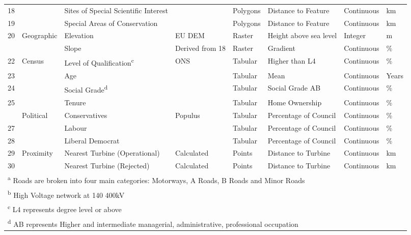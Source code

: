 \documentclass[a4paper,]{article}
\theoremstyle{definition}
\theoremstyle{definition}
\theoremstyle{definition}
\theoremstyle{remark}
\begin{document}
\begin{landscape}
\begin{table}
{\begin{tabular}[t]{rlllllll}
18 &  & Sites of Special Scientific Interest &  & Polygons & Distance to Feature & Continuous & km\\
19 &  & Special Areas of Conservation &  & Polygons & Distance to Feature & Continuous & km\\
20 & Geographic & Elevation & EU DEM & Raster & Height above sea level & Integer & m\\
\addlinespace
21 &  & Slope & Derived from 18 & Raster & Gradient & Continuous & \%\\
22 & Census & Level of Qualification\textsuperscript{c} & ONS & Tabular & Higher than L4 & Continuous & \%\\
23 &  & Age &  & Tabular & Mean & Continuous & Years\\
24 &  & Social Grade\textsuperscript{d} &  & Tabular & Social Grade AB & Continuous & \%\\
25 &  & Tenure &  & Tabular & Home Ownership & Continuous & \%\\
\addlinespace
26 & Political & Conservatives & Populus & Tabular & Percentage of Council & Continuous & \%\\
27 &  & Labour &  & Tabular & Percentage of Council & Continuous & \%\\
28 &  & Liberal Democrat &  & Tabular & Percentage of Council & Continuous & \%\\
29 & Proximity & Nearest Turbine (Operational) & Calculated & Points & Distance to Turbine & Continuous & km\\
30 &  & Nearest Turbine (Rejected) & Calculated & Points & Distance to Turbine & Continuous & km\\
\bottomrule
\multicolumn{8}{l}{\textsuperscript{a} Roads are broken into four main categories: Motorways, A Roads, B Roads and Minor Roads}\\
\multicolumn{8}{l}{\textsuperscript{b} High Voltage network at 140 400kV}\\
\multicolumn{8}{l}{\textsuperscript{c} L4 represents degree level or above}\\
\multicolumn{8}{l}{\textsuperscript{d} AB represents Higher and intermediate managerial, administrative, professional occupation}\\
\end{tabular}}
\end{table}
\end{landscape}
\end{document}
